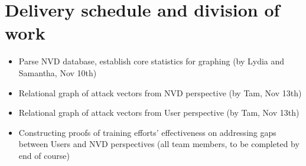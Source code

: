 \documentclass{article} %
\begin{document}
\section{Delivery schedule and division of work}

\begin{itemize}
\item Parse NVD database, establish core statistics for graphing (by Lydia and Samantha, Nov 10th)
\item Relational graph of attack vectors from NVD perspective (by Tam, Nov 13th)
\item Relational graph of attack vectors from User perspective (by Tam, Nov 13th)
\item Constructing proofs of training efforts' effectiveness on addressing gaps between Users and NVD perspectives (all team members, to be completed by end of course)
\end{itemize}
\end{document}
